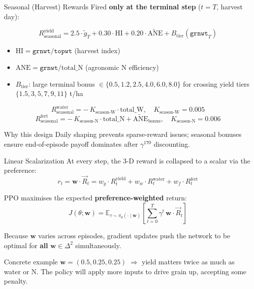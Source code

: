 \documentclass[10pt,aspectratio=169]{beamer}
\newcommand{\Rvec}{\vec{R}}
\newcommand{\wvec}{\mathbf{w}}
\newcommand{\strong}[1]{\textbf{\textcolor{cAccent}{#1}}}
\begin{document}
\begin{frame}{Seasonal (Harvest) Rewards}
  Fired \strong{only at the terminal step} ($t = T$, harvest day):

  \[
    R^{\text{yield}}_{\text{seasonal}} =
      2.5 \cdot \tilde{g}_T
      + 0.30 \cdot \mathrm{HI}
      + 0.20 \cdot \widetilde{\mathrm{ANE}}
      + B_{\text{tier}}(\texttt{grnwt}_T)
  \]
  \begin{itemize}\small
    \item $\mathrm{HI} = \texttt{grnwt}/\texttt{topwt}$ \quad (harvest index)
    \item $\mathrm{ANE} = \texttt{grnwt}/\text{total\_N}$ \quad (agronomic N efficiency)
    \item $B_{\text{tier}}$: large terminal bonus $\in \{0.5, 1.2, 2.5, 4.0, 6.0, 8.0\}$
      for crossing yield tiers $\{1.5, 3, 5, 7, 9, 11\}$ t/ha
  \end{itemize}

  \vspace{0.5em}
  \[
    R^{\text{water}}_{\text{seasonal}} = -\,K_{\text{season-W}} \cdot \mathrm{total\_W}, \quad K_{\text{season-W}} = 0.005
  \]
  \[
    R^{\text{fert}}_{\text{seasonal}} = -\,K_{\text{season-N}} \cdot \mathrm{total\_N} + \widetilde{\mathrm{ANE}}_{\text{bonus}}, \quad K_{\text{season-N}} = 0.006
  \]

  \vspace{0.5em}
  \begin{block}{Why this design}
  Daily shaping prevents sparse-reward issues; seasonal bonuses ensure end-of-episode payoff dominates after $\gamma^{170}$ discounting.
  \end{block}
\end{frame}

\begin{frame}{Linear Scalarization}
  At every step, the 3-D reward is collapsed to a scalar via the preference:
  \[
    r_t = \wvec \cdot \Rvec_t
        = w_y \cdot R^{\text{yield}}_t + w_w \cdot R^{\text{water}}_t + w_f \cdot R^{\text{fert}}_t
  \]

  \vspace{0.5em}
  PPO maximises the expected \strong{preference-weighted} return:
  \[
    J(\theta; \wvec) = \mathbb{E}_{\tau \sim \pi_\theta(\cdot \mid \wvec)}\!\!\left[\sum_{t=0}^{T} \gamma^t \, \wvec \cdot \Rvec_t \right]
  \]

  Because $\wvec$ varies across episodes, gradient updates push the network to be optimal for \strong{all} $\wvec \in \Delta^2$ simultaneously.

  \vspace{0.6em}
  \begin{exampleblock}{Concrete example}
  $\wvec = (0.5, 0.25, 0.25)$ $\Rightarrow$
  yield matters twice as much as water or N. The policy will apply
  more inputs to drive grain up, accepting some penalty.
  \end{exampleblock}
\end{frame}
\end{document}
